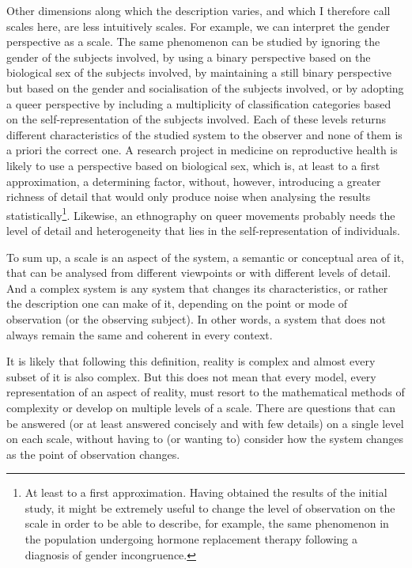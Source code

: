 Other dimensions along which the description varies, and which I therefore call scales here, are less intuitively scales.
For example, we can interpret the gender perspective as a scale.
The same phenomenon can be studied by ignoring the gender of the subjects involved, by using a binary perspective based on the biological sex of the subjects involved, by maintaining a still binary perspective but based on the gender and socialisation of the subjects involved, or by adopting a queer perspective by including a multiplicity of classification categories based on the self-representation of the subjects involved.
Each of these levels returns different characteristics of the studied system to the observer and none of them is a priori the correct one.
A research project in medicine on reproductive health is likely to use a perspective based on biological sex, which is, at least to a first approximation, a determining factor, without, however, introducing a greater richness of detail that would only produce noise when analysing the results statistically\footnote{At least to a first approximation. Having obtained the results of the initial study, it might be extremely useful to change the level of observation on the scale in order to be able to describe, for example, the same phenomenon in the population undergoing hormone replacement therapy following a diagnosis of gender incongruence.}.
Likewise, an ethnography on queer movements probably needs the level of detail and heterogeneity that lies in the self-representation of individuals.

To sum up, a scale is an aspect of the system, a semantic or conceptual area of it, that can be analysed from different viewpoints or with different levels of detail.
And a complex system is any system that changes its characteristics, or rather the description one can make of it, depending on the point or mode of observation (or the observing subject). In other words, a system that does not always remain the same and coherent in every context.

It is likely that following this definition, reality is complex and almost every subset of it is also complex. But this does not mean that every model, every representation of an aspect of reality, must resort to the mathematical methods of complexity or develop on multiple levels of a scale.
There are questions that can be answered (or at least answered concisely and with few details) on a single level on each scale, without having to (or wanting to) consider how the system changes as the point of observation changes.

